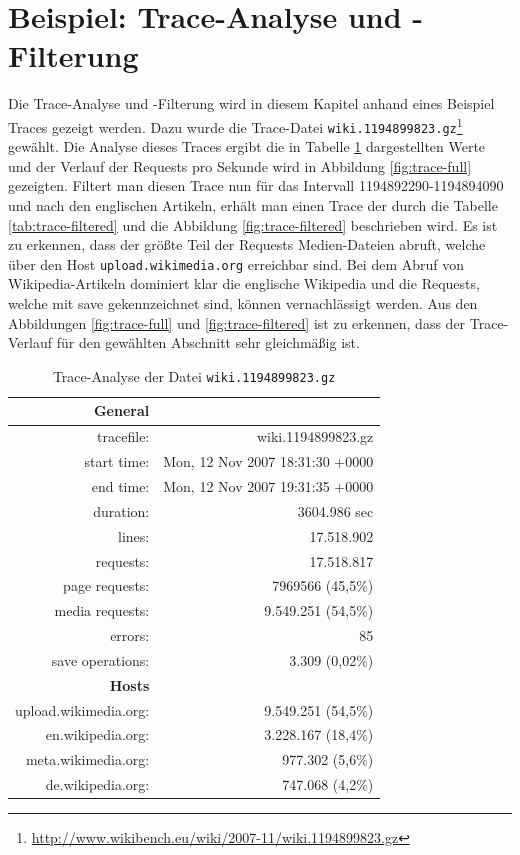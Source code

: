\section{Beispiel: Trace-Analyse und -Filterung}
\label{sec:beispiel}

Die Trace-Analyse und -Filterung wird in diesem Kapitel anhand eines Beispiel Traces gezeigt werden. Dazu wurde die Trace-Datei \texttt{wiki.1194899823.gz}\footnote{\url{http://www.wikibench.eu/wiki/2007-11/wiki.1194899823.gz}} gewählt. Die Analyse dieses Traces ergibt die in Tabelle \ref{tab:trace-full} dargestellten Werte und der Verlauf der Requests pro Sekunde wird in Abbildung \ref{fig:trace-full} gezeigten. Filtert man diesen Trace nun für das Intervall 1194892290-1194894090 und nach den englischen Artikeln, erhält man einen Trace der durch die Tabelle \ref{tab:trace-filtered} und die Abbildung \ref{fig:trace-filtered} beschrieben wird. Es ist zu erkennen, dass der größte Teil der Requests Medien-Dateien abruft, welche über den Host \texttt{upload.wikimedia.org} erreichbar sind. Bei dem Abruf von Wikipedia-Artikeln dominiert klar die englische Wikipedia und die Requests, welche mit \glqq{}save\grqq{} gekennzeichnet sind, können vernachlässigt werden. Aus den Abbildungen \ref{fig:trace-full} und \ref{fig:trace-filtered} ist zu erkennen, dass der Trace-Verlauf für den gewählten Abschnitt sehr gleichmäßig ist.

\begin{table}
  \centering
  \begin{tabular}{|rr|}\hline
    \textbf{General} & \\\hline
    tracefile: & wiki.1194899823.gz \\
    start time: & Mon, 12 Nov 2007 18:31:30 +0000 \\
    end time: & Mon, 12 Nov 2007 19:31:35 +0000 \\
    duration: & 3604.986 sec \\
    lines: & 17.518.902 \\
    requests: & 17.518.817 \\
    page requests: & 7969566 (45,5\%) \\
    media requests: & 9.549.251 (54,5\%) \\
    errors: & 85 \\
    save operations: & 3.309 (0,02\%)\\\hline\hline
    \textbf{Hosts} & \\\hline
    upload.wikimedia.org: & 9.549.251 (54,5\%) \\
    en.wikipedia.org:&  3.228.167 (18,4\%) \\
    meta.wikimedia.org: &  977.302 (5,6\%) \\
    de.wikipedia.org:  & 747.068 (4,2\%)\\\hline
  \end{tabular}
  \caption{Trace-Analyse der Datei \texttt{wiki.1194899823.gz}}
  \label{tab:trace-full}
\end{table}

